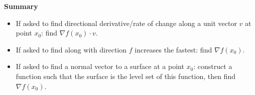 \documentclass[openany]{book}
\begin{document}
\noindent 
\textbf{Summary}
\begin{itemize}
    \item If asked to find directional derivative/rate of change along a unit vector $v$ at point $x_0$: find $\nabla f(x_0)\cdot v$.
    \item If asked to find along with direction $f$ increases the fastest: find $\nabla f(x_0)$.
    \item If asked to find a normal vector to a surface at a point $x_0$: construct a function such that the surface is the level set of this function, then find $\nabla f(x_0)$.
\end{itemize}
 
\end{document}
